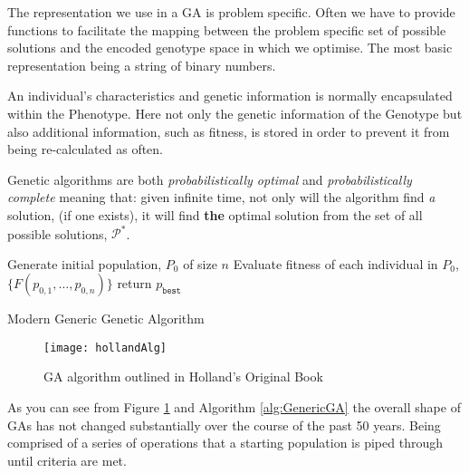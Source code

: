 The representation we use in a GA is problem specific. Often we have to provide functions to facilitate the mapping between the problem specific set of possible solutions and the encoded genotype space in which we optimise. The most basic representation being a string of binary numbers.

An individual's characteristics and genetic information is normally encapsulated within the Phenotype. Here not only the genetic information of the Genotype but also additional information, such as fitness, is stored in order to prevent it from being re-calculated as often.

Genetic algorithms are both \textit{probabilistically optimal} and \textit{probabilistically complete}\cite{kalaOnroadIntelligentVehicles2016} meaning that: given infinite time, not only will the algorithm find \textit{a} solution, (if one exists), it will find \textbf{the} optimal solution from the set of all possible solutions, $\mathcal{P}^*$.

\begin{algorithm}[H]
	\label{alg:GenericGA}
	\SetAlgoLined
	Generate initial population, $P_0$ of size $n$\;
	Evaluate fitness of each individual in $P_0$, $\{F(p_{0,1},\ldots, p_{0,n})\}$\;
	return $p_{\texttt{best}}$

	\caption{Modern Generic Genetic Algorithm}
\end{algorithm}

\begin{figure}[htpb]
    \centering
    \texttt{[image: hollandAlg]}
    \caption{GA algorithm outlined in Holland's Original Book\cite{hollandAdaptationNaturalArtificial1992}}
    \label{fig:hollandAlg}
\end{figure}

As you can see from Figure \ref{fig:hollandAlg} and Algorithm \ref{alg:GenericGA} the overall shape of GAs has not changed substantially over the course of the past 50 years. Being comprised of a series of operations that a starting population is piped through until criteria are met.

